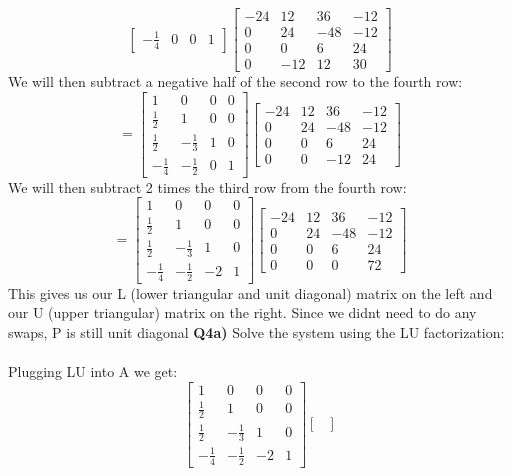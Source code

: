\documentclass[12pt]{article}
\begin{document}
\begin{adjustwidth}{0em}{0pt}
\[\begin{bmatrix}
-\frac{1}{4} & 0 & 0 & 1
\end{bmatrix}
\begin{bmatrix}
-24 & 12 & 36 & -12\\
0 & 24 & -48 & -12\\
0 & 0 & 6 & 24\\
0 & -12 & 12 & 30
\end{bmatrix}\]
We will then subtract a negative half of the second row to the fourth row:
\[
=
\begin{bmatrix}
1 & 0 & 0 & 0\\
\frac{1}{2} & 1 & 0 & 0\\
\frac{1}{2} & -\frac{1}{3} & 1 & 0\\
-\frac{1}{4} & -\frac{1}{2} & 0 & 1
\end{bmatrix}
\begin{bmatrix}
-24 & 12 & 36 & -12\\
0 & 24 & -48 & -12\\
0 & 0 & 6 & 24\\
0 & 0 & -12 & 24
\end{bmatrix}\]
We will then subtract 2 times the third row from the fourth row:
\[
=
\begin{bmatrix}
1 & 0 & 0 & 0\\
\frac{1}{2} & 1 & 0 & 0\\
\frac{1}{2} & -\frac{1}{3} & 1 & 0\\
-\frac{1}{4} & -\frac{1}{2} & -2 & 1
\end{bmatrix}
\begin{bmatrix}
-24 & 12 & 36 & -12\\
0 & 24 & -48 & -12\\
0 & 0 & 6 & 24\\
0 & 0 & 0 & 72
\end{bmatrix}\]
This gives us our L (lower triangular and unit diagonal) matrix on the left and our U (upper triangular) matrix on the right. Since we didnt need to do any swaps, P is still unit diagonal 
\textbf{Q4a)} Solve the system using the LU factorization: \\\\
Plugging LU into A we get:
\[ 
\begin{bmatrix}
1 & 0 & 0 & 0\\
\frac{1}{2} & 1 & 0 & 0\\
\frac{1}{2} & -\frac{1}{3} & 1 & 0\\
-\frac{1}{4} & -\frac{1}{2} & -2 & 1
\end{bmatrix}
\begin{bmatrix}

\end{bmatrix}\]
\end{adjustwidth}
\end{document}
